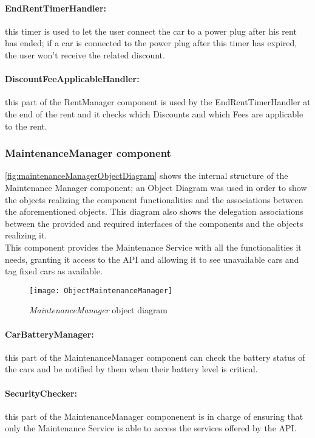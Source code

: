 \paragraph{EndRentTimerHandler:} this timer is used to let the user connect the car to a power plug after his rent has ended; if a car is connected to the power plug after this timer has expired, the user won't receive the related discount.
\paragraph{DiscountFeeApplicableHandler:} this part of the RentManager component is used by the EndRentTimerHandler at the end of the rent and it checks which Discounts and which Fees are applicable to the rent.

\clearpage
\subsubsection{MaintenanceManager component}
\autoref{fig:maintenanceManagerObjectDiagram} shows the internal structure of the Maintenance Manager component; an Object Diagram was used in order to show the objects realizing the component functionalities and the associations between the aforementioned objects. This diagram also shows the delegation associations between the provided and required interfaces of the components and the objects realizing it.
\\
This component provides the Maintenance Service with all the functionalities it needs, granting it access to the API and allowing it to see unavailable cars and tag fixed cars as available.
\begin{figure}[h!]
	\centering
	\texttt{[image: ObjectMaintenanceManager]}
	\caption{
		\label{fig:maintenanceManagerObjectDiagram} 
		\emph{MaintenanceManager} object diagram
	}
\end{figure}

\paragraph{CarBatteryManager:} this part of the MaintenanceManager component can check the battery status of the cars and be notified by them when their battery level is critical.
\paragraph{SecurityChecker:} this part of the MaintenanceManager componenent is in charge of ensuring that only the Maintenance Service is able to access the services offered by the API.
